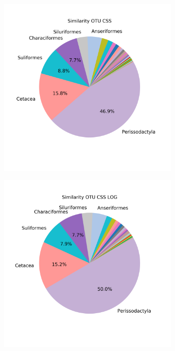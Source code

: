 \begin{figure}[h]
	\centering
	\begin{subfigure}{0.45\textwidth}
		\includegraphics[width=\textwidth]{rfr_dis_mean_pieOTU CSS}
		\caption{}
		\label{fig:dissimotucss}
	\end{subfigure}
	\begin{subfigure}{0.45\textwidth}
		\includegraphics[width=\textwidth]{rfr_dis_mean_pieOTU CSS LOG}

\end{subfigure}
\end{figure}
